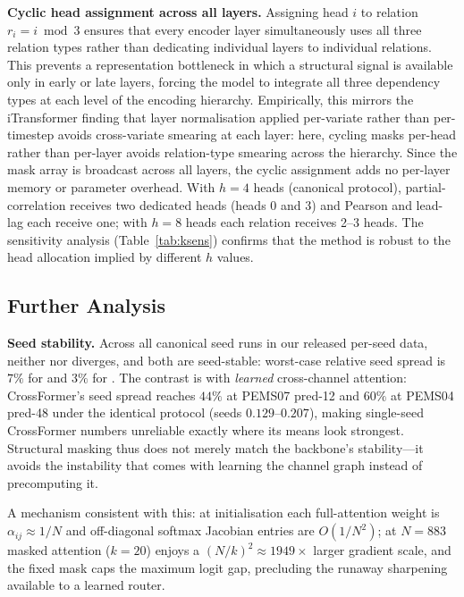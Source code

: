 \textbf{Cyclic head assignment across all layers.}
Assigning head $i$ to relation $r_i{=}i\bmod 3$ ensures that every encoder layer
simultaneously uses all three relation types rather than dedicating individual layers
to individual relations.
This prevents a representation bottleneck in which a structural signal is available
only in early or late layers, forcing the model to integrate all three dependency
types at each level of the encoding hierarchy.
Empirically, this mirrors the iTransformer finding that layer normalisation applied
per-variate rather than per-timestep avoids cross-variate smearing at each layer:
here, cycling masks per-head rather than per-layer avoids relation-type smearing
across the hierarchy.
Since the mask array is broadcast across all layers, the cyclic assignment adds no
per-layer memory or parameter overhead.
With $h{=}4$ heads (canonical protocol), partial-correlation receives two dedicated
heads (heads 0 and 3) and Pearson and lead-lag each receive one; with $h{=}8$
heads each relation receives 2--3 heads.
The sensitivity analysis (Table~\ref{tab:ksens}) confirms that the method is robust
to the head allocation implied by different $h$ values.


\subsection{Further Analysis}
\label{sec:stability}

\textbf{Seed stability.} Across all canonical seed runs in our released
per-seed data, neither \itrans{} nor \mr{} diverges, and both are
seed-stable: worst-case relative seed spread is $7\%$ for \itrans{} and
$3\%$ for \mr{}. The contrast is with \emph{learned} cross-channel
attention: CrossFormer's seed spread reaches $44\%$ at PEMS07 pred-12 and
$60\%$ at PEMS04 pred-48 under the identical protocol (seeds
$0.129$--$0.207$), making single-seed CrossFormer numbers unreliable
exactly where its means look strongest. Structural masking thus does not
merely match the backbone's stability---it avoids the instability that
comes with learning the channel graph instead of precomputing it.

A mechanism consistent with this: at initialisation each full-attention
weight is $\alpha_{ij}{\approx}1/N$ and off-diagonal softmax Jacobian
entries are $O(1/N^2)$; at $N{=}883$ masked attention ($k{=}20$) enjoys a
$(N/k)^2{\approx}1949\times$ larger gradient scale, and the fixed mask caps
the maximum logit gap, precluding the runaway sharpening available to a
learned router.

